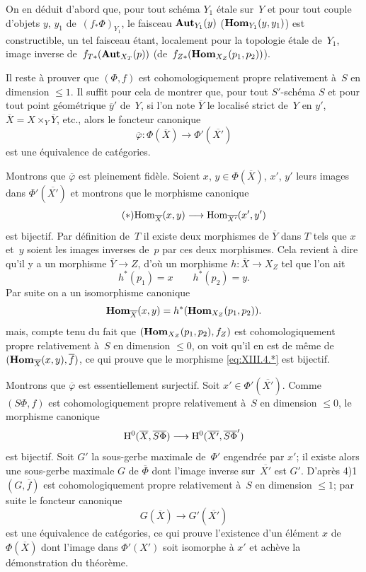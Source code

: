 On en d\'eduit d'abord que, pour tout sch\'ema $Y_1$ \'etale sur~$Y$ et pour tout couple d'objets $y$, $y_1$ de~$(f_*\Phi)_{Y_1}$, le
faisceau $\operatorname{\mathbf{Aut}}_{Y_1}(y)$ (\resp $\operatorname{\mathbf{Hom}}_{Y_1}(y,y_1)$) est
constructible, un tel faisceau \'etant, localement pour la topologie
\'etale de~$Y_1$, image inverse de~$f_{T*}(\operatorname{\mathbf{Aut}}_{X_T}(p))$
(\resp de~$f_{Z*}(\operatorname{\mathbf{Hom}}_{X_Z}(p_1,p_2))$).

Il reste \`a prouver que $(\Phi,f)$ est cohomologiquement propre
relativement
\`a~$S$ en dimension $\le 1$. Il suffit pour cela de montrer que,
pour tout $S'$-sch\'ema $S$ et pour tout point g\'eom\'etrique
$\overline{y}'$ de~$Y$, si l'on note $\overline{Y}$ le localis\'e
strict de~$Y$ en $y'$, $\overline{X}=X \times_Y \overline{Y}$, etc.,
alors le foncteur canonique
$$
\overline{\varphi} \colon \Phi(\overline{X}) \to
\Phi'(\overline{X'})
$$
est une \'equivalence de cat\'egories.

Montrons que $\overline{\varphi}$ est pleinement fid\`ele. Soient
$x$, $y \in \Phi(\overline{X})$, $x'$, $y'$ leurs images dans
$\Phi'(\overline{X'})$ et montrons que le morphisme canonique
\begin{equation*}
\label{eq:XIII.4.*} \tag{$*$} {\Hom_{\overline{X}}(x,y)
\to \Hom_{\overline{X'}}(x',y') }
\end{equation*}
est bijectif. Par d\'efinition de~$T$ il existe deux morphismes de
$\overline{Y}$ dans $T$ tels que $x$ et~$y$ soient les images inverses
de~$p$ par ces deux morphismes. Cela revient \`a dire qu'il y a un
morphisme $\overline {Y} \to Z$, d'o\`u un morphisme $h\colon
\overline{X} \to X_Z$ tel que l'on ait
$$
h^*(p_1)=x \qquad h^*(p_2)=y.
$$
Par suite on a un isomorphisme canonique
$$
\operatorname{\mathbf{Hom}}_{\overline{X}}(x,y)=h^*(\operatorname{\mathbf{Hom}}_{X_Z}(p_1,p_2) ).
$$
mais, compte tenu du fait que $(\operatorname{\mathbf{Hom}}_{X_Z}(p_1,p_2),f_Z)$ est
cohomologiquement propre relativement \`a~$S$ en dimension $\le 0$,
on voit qu'il en est de m\^eme de
$(\operatorname{\mathbf{Hom}}_{\overline{X}}(x,y),\overline{f})$, ce qui prouve que le
morphisme \eqref{eq:XIII.4.*} est bijectif.

Montrons que $\overline{\varphi}$ est essentiellement surjectif. Soit
$x'\in \Phi'(\overline{X'})$. Comme $(S\Phi,f)$ est cohomologiquement
propre relativement \`a~$S$ en dimension $\le 0$, le morphisme
canonique
$$
\H^0(\overline{X},\overline{S\Phi}) \to
\H^0(\overline{X'},\overline{S\Phi}')
$$
est bijectif. Soit $G'$ la sous-gerbe maximale de~$\Phi'$
engendr\'ee par $x'$; il existe alors une sous-gerbe maximale $G$ de
$\overline{\Phi}$ dont l'image inverse sur~$\overline{X'}$ est
$G'$. D'apr\`es 4)1 $(G,\overline{f})$ est cohomologiquement propre
relativement \`a~$S$ en dimension $\le 1$; par suite le foncteur
canonique
$$
G(\overline{X}) \to G'(\overline{X'})
$$
est une \'equivalence de cat\'egories, ce qui prouve l'existence
d'un \'el\'ement $x$ de~$\Phi(\overline{X})$ dont l'image dans
$\Phi'(X')$ soit isomorphe \`a $x'$ et ach\`eve la
d\'emonstration du th\'eor\`eme.

